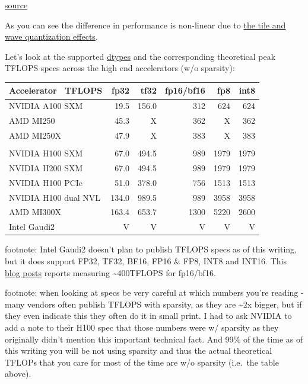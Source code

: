\documentclass[
]{report}
\begin{document}
\href{https://developer.nvidia.com/blog/cuda-11-features-revealed/}{source}

As you can see the difference in performance is non-linear due to
\href{../../training/performance\#tile-and-wave-quantization}{the tile
and wave quantization effects}.

Let's look at the supported \href{../../training/dtype.md}{dtypes} and
the corresponding theoretical peak TFLOPS specs across the high end
accelerators (w/o sparsity):

\begin{longtable}[]{@{}lrrrrr@{}}
\toprule\noalign{}
Accelerator ~TFLOPS & fp32 & tf32 & fp16/bf16 & fp8 & int8 \\
\midrule\noalign{}
\endhead
\bottomrule\noalign{}
\endlastfoot
NVIDIA A100 SXM & 19.5 & 156.0 & 312 & 624 & 624 \\
AMD MI250 & 45.3 & X & 362 & X & 362 \\
AMD MI250X & 47.9 & X & 383 & X & 383 \\
& & & & & \\
NVIDIA H100 SXM & 67.0 & 494.5 & 989 & 1979 & 1979 \\
NVIDIA H200 SXM & 67.0 & 494.5 & 989 & 1979 & 1979 \\
NVIDIA H100 PCIe & 51.0 & 378.0 & 756 & 1513 & 1513 \\
NVIDIA H100 dual NVL & 134.0 & 989.5 & 989 & 3958 & 3958 \\
AMD MI300X & 163.4 & 653.7 & 1300 & 5220 & 2600 \\
Intel Gaudi2 & V & V & V & V & V \\
\end{longtable}

footnote: Intel Gaudi2 doesn't plan to publish TFLOPS specs as of this
writing, but it does support FP32, TF32, BF16, FP16 \& FP8, INT8 and
INT16. This
\href{https://www.databricks.com/blog/llm-training-and-inference-intel-gaudi2-ai-accelerators}{blog
posts} reports measuring \textasciitilde400TFLOPS for fp16/bf16.

footnote: when looking at specs be very careful at which numbers you're
reading - many vendors often publish TFLOPS with sparsity, as they are
\textasciitilde2x bigger, but if they even indicate this they often do
it in small print. I had to ask NVIDIA to add a note to their H100 spec
that those numbers were w/ sparsity as they originally didn't mention
this important technical fact. And 99\% of the time as of this writing
you will be not using sparsity and thus the actual theoretical TFLOPs
that you care for most of the time are w/o sparsity (i.e.~the table
above).
\end{document}
